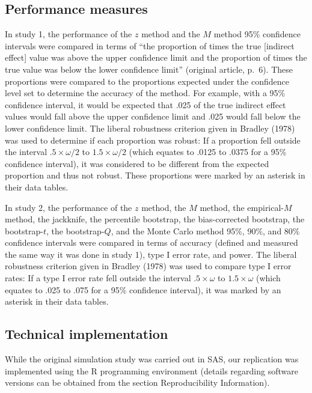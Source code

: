 \documentclass[10,a4paperpaper,]{article}
\begin{document}
\subsection{Performance measures}

In study 1, the performance of the \(z\) method and the \(M\) method
95\% confidence intervals were compared in terms of ``the proportion of
times the true {[}indirect effect{]} value was above the upper
confidence limit and the proportion of times the true value was below
the lower confidence limit'' (original article, p.~6). These proportions
were compared to the proportions expected under the confidence level set
to determine the accuracy of the method. For example, with a 95\%
confidence interval, it would be expected that .025 of the true indirect
effect values would fall above the upper confidence limit and .025 would
fall below the lower confidence limit. The liberal robustness criterion
given in Bradley (1978) was used to determine if each proportion was
robust: If a proportion fell outside the interval \(.5 \times \omega/2\)
to \(1.5 \times \omega/2\) (which equates to .0125 to .0375 for a 95\%
confidence interval), it was considered to be different from the
expected proportion and thus not robust. These proportions were marked
by an asterisk in their data tables.

In study 2, the performance of the \(z\) method, the \(M\) method, the
empirical-\(M\) method, the jackknife, the percentile bootstrap, the
bias-corrected bootstrap, the bootstrap-\(t\), the bootstrap-\(Q\), and
the Monte Carlo method 95\%, 90\%, and 80\% confidence intervals were
compared in terms of accuracy (defined and measured the same way it was
done in study 1), type I error rate, and power. The liberal robustness
criterion given in Bradley (1978) was used to compare type I error
rates: If a type I error rate fell outside the interval
\(.5 \times \omega\) to \(1.5 \times \omega\) (which equates to .025 to
.075 for a 95\% confidence interval), it was marked by an asterisk in
their data tables.

\subsection{Technical implementation}

While the original simulation study was carried out in SAS, our
replication was implemented using the R programming environment (details
regarding software versions can be obtained from the section
Reproducibility Information).
\end{document}
